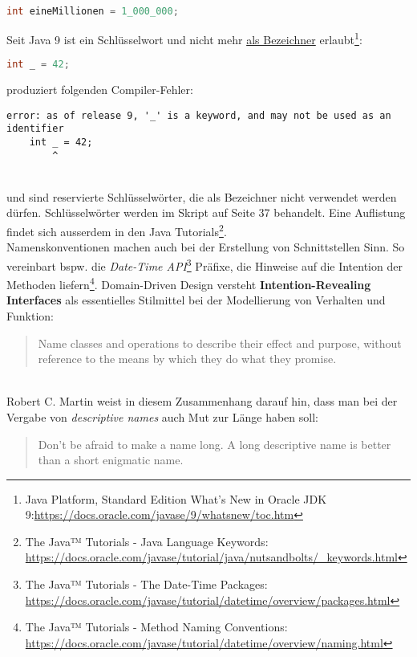 \begin{lstlisting}[language=java]
int eineMillionen = 1_000_000;
\end{lstlisting}

Seit Java 9 ist \code{_} ein Schlüsselwort und nicht mehr \underline{als Bezeichner} erlaubt\footnote{
    Java Platform, Standard Edition What’s New in Oracle JDK 9:\url{https://docs.oracle.com/javase/9/whatsnew/toc.htm}
}:

\begin{lstlisting}[language=java]
int _ = 42;
\end{lstlisting}

produziert folgenden Compiler-Fehler:

\begin{lstlisting}[language=text]
error: as of release 9, '_' is a keyword, and may not be used as an identifier
    int _ = 42;
        ^
\end{lstlisting}\\



 und  sind reservierte Schlüsselwörter, die als Bezeichner nicht verwendet werden dürfen.
Schlüsselwörter werden im Skript auf Seite 37 behandelt. Eine Auflistung findet sich ausserdem in den Java
Tutorials\footnote{
    The Java™ Tutorials - Java Language Keywords: \url{https://docs.oracle.com/javase/tutorial/java/nutsandbolts/\_keywords.html}
}.\\

Namenskonventionen machen auch bei der Erstellung von Schnittstellen Sinn.
So vereinbart bspw. die \textit{Date-Time API}\footnote{
    The Java™ Tutorials - The Date-Time Packages: \url{https://docs.oracle.com/javase/tutorial/datetime/overview/packages.html}
}
Präfixe, die Hinweise auf die Intention der Methoden liefern\footnote{
    The Java™ Tutorials - Method Naming Conventions: \url{https://docs.oracle.com/javase/tutorial/datetime/overview/naming.html}
}.
Domain-Driven Design\cite{Eva04} versteht \textbf{Intention-Revealing Interfaces} als essentielles Stilmittel bei
der Modellierung von Verhalten und Funktion:

    \blockquote[{\cite[247]{Eva04}}]{
        Name classes and operations to describe their effect and purpose, without reference to the means by which they
        do what they promise.
    }\\

Robert C. Martin weist in diesem Zusammenhang darauf hin, dass man bei der Vergabe von \textit{descriptive names} auch Mut zur
Länge haben soll:

    \blockquote[{\cite[39]{Mar08}}]{
        Don't be afraid to make a name long. A long descriptive name is better than a short enigmatic name.
    }




